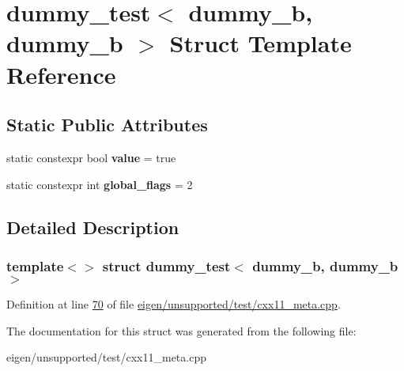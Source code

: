 \hypertarget{structdummy__test_3_01dummy__b_00_01dummy__b_01_4}{}\section{dummy\+\_\+test$<$ dummy\+\_\+b, dummy\+\_\+b $>$ Struct Template Reference}
\label{structdummy__test_3_01dummy__b_00_01dummy__b_01_4}
\subsection*{Static Public Attributes}
\begin{DoxyCompactItemize}
\item 
\mbox{\label{structdummy__test_3_01dummy__b_00_01dummy__b_01_4_a42941175b19d4ecaf43b19c99c0a42af}} 
static constexpr bool {\bfseries value} = true
\item 
\mbox{\label{structdummy__test_3_01dummy__b_00_01dummy__b_01_4_abc7439514d55ad4af32616379ac09a9b}} 
static constexpr int {\bfseries global\+\_\+flags} = 2
\end{DoxyCompactItemize}


\subsection{Detailed Description}
\subsubsection*{template$<$$>$\newline
struct dummy\+\_\+test$<$ dummy\+\_\+b, dummy\+\_\+b $>$}



Definition at line \hyperlink{eigen_2unsupported_2test_2cxx11__meta_8cpp_source_l00070}{70} of file \hyperlink{eigen_2unsupported_2test_2cxx11__meta_8cpp_source}{eigen/unsupported/test/cxx11\+\_\+meta.\+cpp}.



The documentation for this struct was generated from the following file\+:\begin{DoxyCompactItemize}
\item 
eigen/unsupported/test/cxx11\+\_\+meta.\+cpp\end{DoxyCompactItemize}
